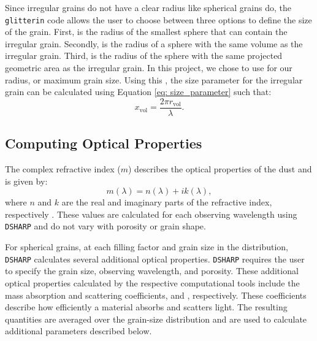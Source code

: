 Since irregular grains do not have a clear radius like spherical grains do, the \texttt{glitterin} code allows the user to choose between three options to define the size of the grain. First, \renc is the radius of the smallest sphere that can contain the irregular grain. Secondly, \rvol is the radius of a sphere with the same volume as the irregular grain. Third, \rpja is the radius of the sphere with the same projected geometric area as the irregular grain. In this project, we chose to use \rvol for our radius, or maximum grain size. Using this \rvolNS, the size parameter for the irregular grain can be calculated using Equation \ref{eq: size_parameter} such that:
\begin{equation}
    x_\text{vol} = \frac{2 \pi r_\text{vol}}{\lambda}.
\end{equation}
\noindent 







\subsection{Computing Optical Properties}
\label{sec: ch5_opticalproperties}


The complex refractive index ($m$) describes the optical properties of the dust and is given by:
\begin{equation}
 m(\lambda) = n(\lambda) + ik(\lambda),
\end{equation}
\noindent where $n$ and $k$ are the real and imaginary parts of the refractive index, respectively \citep{Zhang2023}. These values are calculated for each observing wavelength using \texttt{DSHARP} and do not vary with porosity or grain shape. 


For spherical grains, at each filling factor and grain size in the distribution, \texttt{DSHARP} calculates several additional optical properties. \texttt{DSHARP} requires the user to specify the grain size, observing wavelength, and porosity. These additional optical properties calculated by the respective computational tools include the mass absorption and scattering coefficients, \kabs and \kscaNS, respectively. These coefficients describe how efficiently a material absorbs and scatters light. The resulting quantities are averaged over the grain-size distribution and are used to calculate additional parameters described below. 



